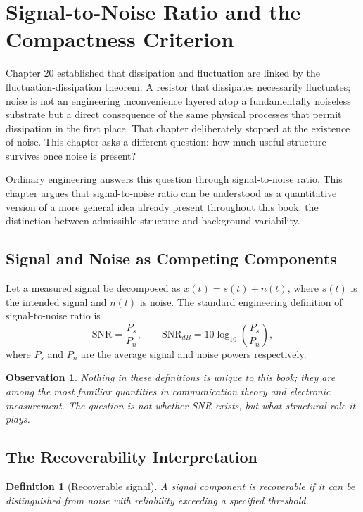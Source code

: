 \documentclass[12pt]{article}
\newtheorem{definition}{Definition}
\newtheorem{observation}{Observation}
\begin{document}
\section{Signal-to-Noise Ratio and the Compactness Criterion}

Chapter 20 established that dissipation and fluctuation are linked by the fluctuation-dissipation theorem. A resistor that dissipates necessarily fluctuates; noise is not an engineering inconvenience layered atop a fundamentally noiseless substrate but a direct consequence of the same physical processes that permit dissipation in the first place. That chapter deliberately stopped at the existence of noise. This chapter asks a different question: how much useful structure survives once noise is present?

Ordinary engineering answers this question through signal-to-noise ratio. This chapter argues that signal-to-noise ratio can be understood as a quantitative version of a more general idea already present throughout this book: the distinction between admissible structure and background variability.

\subsection{Signal and Noise as Competing Components}

Let a measured signal be decomposed as $x(t)=s(t)+n(t)$, where $s(t)$ is the intended signal and $n(t)$ is noise. The standard engineering definition of signal-to-noise ratio is
\[
\mathrm{SNR}=\frac{P_s}{P_n}, \qquad \mathrm{SNR}_{dB}=10\log_{10}\left(\frac{P_s}{P_n}\right),
\]
where $P_s$ and $P_n$ are the average signal and noise powers respectively.

\begin{observation}
Nothing in these definitions is unique to this book; they are among the most familiar quantities in communication theory and electronic measurement. The question is not whether SNR exists, but what structural role it plays.
\end{observation}

\subsection{The Recoverability Interpretation}

\begin{definition}[Recoverable signal]
A signal component is recoverable if it can be distinguished from noise with reliability exceeding a specified threshold.
\end{definition}
\end{document}
